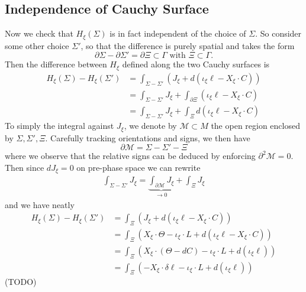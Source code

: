 \documentclass[11pt,letterpaper]{article}
\newcommand{\LP}{\left(}
\newcommand{\RP}{\right)}
\newcommand{\mc}[1]{\mathcal{#1}}
\newcommand{\D}{\partial}
\begin{document}
\subsection{Independence of Cauchy Surface}
Now we check that $H_\xi(\Sigma)$ is in fact independent of the choice of $\Sigma$. So consider some other choice $\Sigma'$, so that the difference is purely spatial and takes the form \begin{equation}
\D \Sigma - \D \Sigma' = \D \Xi \subset \Gamma \mbox{ with } \Xi \subset \Gamma.
\end{equation}
Then the difference between $H_\xi$ defined along the two Cauchy surfaces is \begin{equation}
\begin{aligned}
H_\xi (\Sigma) - H_\xi(\Sigma') & = \int_{\Sigma - \Sigma'} \LP J_\xi + d \LP \iota_\xi \ell - X_\xi \cdot C \RP \RP \\
& = \int_{\Sigma - \Sigma'} J_\xi + \int_{\D \Xi} \LP \iota_\xi \ell - X_\xi \cdot C \RP \\
& = \int_{\Sigma - \Sigma'} J_\xi + \int_\Xi d \LP \iota_\xi \ell - X_\xi \cdot C \RP
\end{aligned}
\end{equation}
To simply the integral against $J_\xi$, we denote by $\mc{M} \subset M$ the open region enclosed by $\Sigma, \Sigma', \Xi$. Carefully tracking orientations and signs, we then have \begin{equation}
\D \mc{M} = \Sigma - \Sigma' - \Xi
\end{equation}
where we observe that the relative signs can be deduced by enforcing $\D^2 \mc{M} = 0$. Then since $dJ_\xi = 0$ on pre-phase space we can rewrite \begin{equation}
\begin{aligned}
\int_{\Sigma - \Sigma'} J_\xi = \underbrace{\int_{\D \mc{M}} J_\xi}_{\to 0} + \int_{\Xi} J_\xi
\end{aligned}
\end{equation}
and we have neatly \begin{equation}
\begin{aligned}
H_\xi(\Sigma) - H_\xi(\Sigma') & = \int_{\Xi} \LP J_\xi + d \LP \iota_\xi \ell - X_\xi \cdot C \RP \RP  \\
& = \int_{\Xi} \LP X_\xi \cdot \Theta - \iota_\xi \cdot L + d \LP \iota_\xi \ell - X_\xi \cdot C \RP \RP \\
& = \int_\Xi \LP X_\xi \cdot \LP \Theta - d C \RP - \iota_\xi \cdot L + d (\iota_\xi \ell) \RP \\
& = \int_\Xi \LP - X_\xi \cdot \delta \ell - \iota_\xi \cdot L + d (\iota_\xi \ell) \RP
\end{aligned}
\end{equation}
(TODO)
\end{document}
